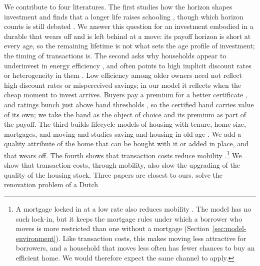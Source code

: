We contribute to four literatures. The first studies how the horizon shapes
investment \citep{becker1962investment,ben1967production} and finds that a
longer life raises schooling
\citep{jayachandran2009life,oster2013limited,fortson2011mortality}, though
which horizon counts is still debated
\citep{hazan2009longevity,cervellati2013life}. We answer this question for
an investment embodied in a durable that wears off and is left behind at a
move: its payoff horizon is short at every age, so the remaining lifetime is
not what sets the age profile of investment; the timing of transactions is. The second asks
why households appear to underinvest in energy efficiency
\citep{jaffe1994energy,allcott2012energy,gerarden2017assessing,fowlie2018weatherization},
and often points to high implicit discount rates or heterogeneity in them
\citep{hausman1979individual,newell2015individual,bento2012there}. Low
efficiency among older owners need not reflect high discount rates or
misperceived savings; in our model it reflects when the cheap moment to
invest arrives. Buyers pay a premium for a better certificate
\citep{fuerst2015energy}, and ratings bunch just above band thresholds
\citep{collins2018bunching}, so the certified band carries value of its
own; we take the band as the object of choice and its premium as part of
the payoff. The third builds lifecycle models of housing with tenure, home
size, mortgages, and moving
\citep{cocco2005portfolio,yang2009consumption,attanasio2012modelling,kaplan2020housing}
and studies saving and housing in old age
\citep{denardi2010elderly,davidoff2010home,nakajima2017reverse,nakajima2020home}.
We add a quality attribute of
the home that can be bought with it or added in place, and that wears off.
The fourth shows that transaction costs reduce mobility
\citep{vanommeren2005new,hilber2017transfer,best2018housing}.\footnote{A mortgage locked in at a low rate also reduces mobility \citep{quigley1987interest,ferreira2010housing,fonseca2024mortgage}. The model has no such lock-in, but it keeps the mortgage rules under which a borrower who moves is more restricted than one without a mortgage (Section~\ref{sec:model-environment}). Like transaction costs, this makes moving less attractive for borrowers, and a household that moves less often has fewer chances to buy an efficient home. We would therefore expect the same channel to apply.} We
show that transaction costs, through mobility, also slow
the upgrading of the quality of the housing stock. Three papers are closest
to ours. \citet{fleischer2026energy} solve the renovation problem of a Dutch
